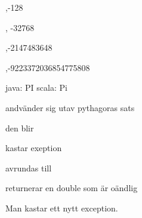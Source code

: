 \Subtask {}

\Subtask {}

\Subtask {}


\Task %

,-128

, -32768

,-2147483648

,-9223372036854775808

\Task %

\Subtask 
java: PI scala: Pi

\Subtask andvänder sig utav pythagoras sats

\Subtask {}

\Task %

\Subtask den blir 

\Subtask kastar exeption

\Subtask {}

\Subtask avrundas till 

\Subtask {}

\Subtask returnerar en double som är oändlig

\Subtask {}

\Subtask {}

\Subtask {}

\Subtask Man kastar ett nytt exception.

\Task %

\Subtask {}

\Subtask {}

\Subtask {}

\Subtask {}

\Subtask {}

\Subtask {}

\Subtask {}

\Subtask {}

\Subtask {}

\Subtask {}

\Subtask {}

\Subtask {}

\Subtask {}

\Subtask {}

\Subtask {}

